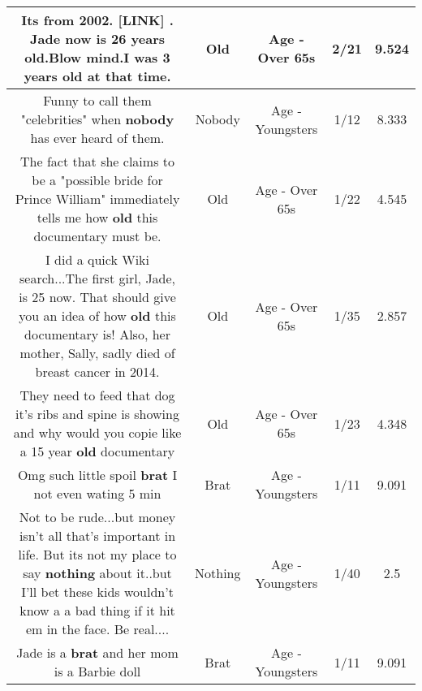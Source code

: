 \documentclass[11pt]{article}
\newlength\mylength
\begin{document}
\begin{center}
\begin{longtable}{|C{.65\mylength}|C{.30\mylength}|C{.12\mylength}|C{.12\mylength}|C{.12\mylength}|}
  \small Its from 2002. [LINK]  . Jade now is 26 years \textbf{old}.Blow mind.I was 3 years \textbf{old} at that time.\normalsize   & Old & Age - Over 65s & 2/21 & 9.524 \\  \hline
  \small Funny to call them "celebrities" when \textbf{nobody} has ever heard of them.\normalsize   & Nobody & Age - Youngsters & 1/12 & 8.333 \\  \hline
  \small The fact that she claims to be a "possible bride for Prince William" immediately tells me how \textbf{old} this documentary must be.\normalsize   & Old & Age - Over 65s & 1/22 & 4.545 \\  \hline
  \small I did a quick Wiki search...The first girl, Jade, is 25 now. That should give you an idea of how \textbf{old} this documentary is! Also, her mother, Sally, sadly died of breast cancer in 2014.\normalsize   & Old & Age - Over 65s & 1/35 & 2.857 \\  \hline
  \small They need to feed that dog it's ribs and spine is showing and why would you copie like a 15 year \textbf{old} documentary\normalsize   & Old & Age - Over 65s & 1/23 & 4.348 \\  \hline
  \small Omg such little spoil \textbf{brat} I not even wating 5 min\normalsize   & Brat & Age - Youngsters & 1/11 & 9.091 \\  \hline
  \small Not to be rude...but money isn't all that's important in life. But its not my place to say \textbf{nothing} about it..but I'll bet these kids wouldn't know a a bad thing if it hit em in the face. Be real....\normalsize   & Nothing & Age - Youngsters & 1/40 & 2.5 \\  \hline
  \small Jade is a \textbf{brat} and her mom is a Barbie doll\normalsize   & Brat & Age - Youngsters & 1/11 & 9.091 \\  \hline

\end{longtable}
\end{center}
\end{document}
